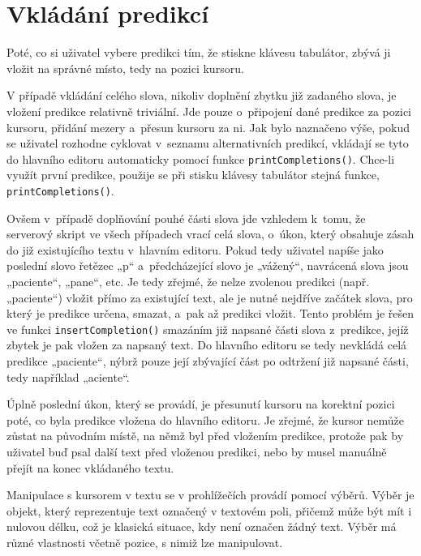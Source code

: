 \documentclass[a4paper,11pt,openany]{book} %
\begin{document}
\section{Vkládání predikcí}

Poté, co si uživatel vybere predikci tím, že stiskne klávesu tabulátor, zbývá ji vložit na správné místo, tedy na pozici kursoru.

V případě vkládání celého slova, nikoliv doplnění zbytku již zadaného slova, je vložení predikce relativně triviální. Jde pouze o~připojení dané predikce za pozici kursoru, přidání mezery a~přesun kursoru za ni. Jak bylo naznačeno výše, pokud se uživatel rozhodne cyklovat v~seznamu alternativních predikcí, vkládají se tyto do hlavního editoru automaticky pomocí funkce {\tt printCompletions()}. Chce-li využít první predikce, použije se při stisku klávesy tabulátor stejná funkce, {\tt printCompletions()}. 

Ovšem v~případě doplňování pouhé části slova jde vzhledem k~tomu, že serverový skript ve všech případech vrací celá slova, o~úkon, který obsahuje zásah do již existujícího textu v~hlavním editoru. Pokud tedy uživatel napíše jako poslední slovo řetězec „p“ a~předcházející slovo je „vážený“, navrácená slova jsou „paciente“, „pane“, etc. Je tedy zřejmé, že nelze zvolenou predikci (např. „paciente“) vložit přímo za existující text, ale je nutné nejdříve začátek slova, pro který je predikce určena, smazat, a~pak až predikci vložit. Tento problém je řešen ve funkci {\tt insertCompletion()} smazáním již napsané části slova z~predikce, jejíž zbytek je pak vložen za napsaný text. Do hlavního editoru se tedy nevkládá celá predikce „paciente“, nýbrž pouze její zbývající část po odtržení již napsané části, tedy například „aciente“.

Úplně poslední úkon, který se provádí, je přesunutí kursoru na korektní pozici poté, co byla predikce vložena do hlavního editoru. Je zřejmé, že kursor nemůže zůstat na původním místě, na němž byl před vložením predikce, protože pak by uživatel buď psal další text před vloženou predikci, nebo by musel manuálně přejít na konec vkládaného textu. 

Manipulace s kursorem v textu se v prohlížečích provádí pomocí výběrů. Výběr je objekt, který reprezentuje text označený v textovém poli, přičemž může být mít i nulovou délku, což je klasická situace, kdy není označen žádný text. Výběr má různé vlastnosti včetně pozice, s nimiž lze manipulovat. %
\end{document}
